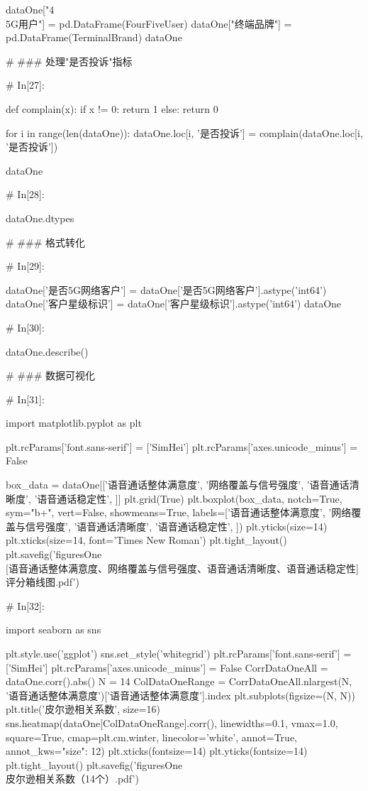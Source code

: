 \documentclass{MathorCupmodeling}
\begin{document}
\begin{python}
	dataOne["4\\5G用户"] = pd.DataFrame(FourFiveUser)
	dataOne["终端品牌"] = pd.DataFrame(TerminalBrand)
	dataOne
	
	
	# ### 处理"是否投诉"指标
	
	# In[27]:
	
	
	def complain(x):
		if x != 0:
			return 1
		else:
			return 0
	
	
	for i in range(len(dataOne)):
		dataOne.loc[i, '是否投诉'] = complain(dataOne.loc[i, '是否投诉'])
	
	dataOne
	
	# In[28]:
	
	
	dataOne.dtypes
	
	# ### 格式转化
	
	# In[29]:
	
	
	dataOne['是否5G网络客户'] = dataOne['是否5G网络客户'].astype('int64')
	dataOne['客户星级标识'] = dataOne['客户星级标识'].astype('int64')
	dataOne
	
	# In[30]:
	
	
	dataOne.describe()
	
	# ### 数据可视化
	
	# In[31]:
	
	
	import matplotlib.pyplot as plt
	
	plt.rcParams['font.sans-serif'] = ['SimHei']
	plt.rcParams['axes.unicode_minus'] = False
	
	box_data = dataOne[['语音通话整体满意度', '网络覆盖与信号强度', '语音通话清晰度', '语音通话稳定性', ]]
	plt.grid(True)
	plt.boxplot(box_data,
				notch=True,
				sym="b+",
				vert=False,
				showmeans=True,
				labels=['语音通话整体满意度', '网络覆盖与信号强度', '语音通话清晰度', '语音通话稳定性', ])
	plt.yticks(size=14)
	plt.xticks(size=14, font='Times New Roman')
	plt.tight_layout()
	plt.savefig('figuresOne\\[附件1][语音通话整体满意度、网络覆盖与信号强度、语音通话清晰度、语音通话稳定性]评分箱线图.pdf')
	
	# In[32]:
	
	
	import seaborn as sns
	
	plt.style.use('ggplot')
	sns.set_style('whitegrid')
	plt.rcParams['font.sans-serif'] = ['SimHei']
	plt.rcParams['axes.unicode_minus'] = False
	CorrDataOneAll = dataOne.corr().abs()
	N = 14
	ColDataOneRange = CorrDataOneAll.nlargest(N, '语音通话整体满意度')['语音通话整体满意度'].index
	plt.subplots(figsize=(N, N))
	plt.title('皮尔逊相关系数', size=16)
	sns.heatmap(dataOne[ColDataOneRange].corr(),
				linewidths=0.1,
				vmax=1.0,
				square=True,
				cmap=plt.cm.winter,
				linecolor='white',
				annot=True,
				annot_kws={"size": 12})
	plt.xticks(fontsize=14)
	plt.yticks(fontsize=14)
	plt.tight_layout()
	plt.savefig('figuresOne\\[附件1]皮尔逊相关系数（14个）.pdf')
	

\end{python}
\end{document}
